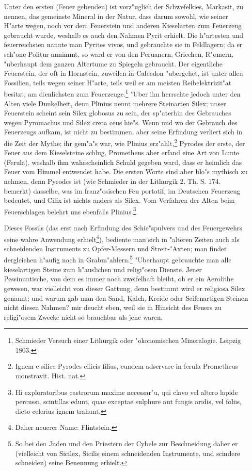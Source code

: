 \documentclass[a4paper, 11pt, oneside, polutonikogreek, german]{article}
\begin{document}
Unter den ersten (Feuer gebenden) ist vorz"uglich der Schwefelkies, Markasit, zu nennen, das gemeinste Mineral in der Natur, dass darum sowohl, wie seiner H"arte wegen, noch vor dem Feuerstein und anderen Kieselarten zum Feuerzeug gebraucht wurde, weshalb es auch den Nahmen Pyrit erhielt. Die h"artesten und feuerreichsten nannte man Pyrites vivos, und gebrauchte sie in Feldlagern; da er sch"one Politur annimmt, so ward er von den Peruanern, Griechen, R"omern, "uberhaupt dem ganzen Altertume zu Spiegeln gebraucht. Der eigentliche Feuerstein, der oft in Hornstein, zuweilen in Calcedon "ubergehet, ist unter allen Fossilien, teils wegen seiner H"arte, teils weil er am meisten Reibelektrizit"at besitzt, am dienlichsten zum Feuerzeuge.\footnote{Schmieder Versuch einer Lithurgik oder "okonomischen Mineralogie. Leipzig 1803.} "Uber ihn herrschte jedoch unter den Alten viele Dunkelheit, denn Plinius nennt mehrere Steinarten Silex; unser Feuerstein scheint sein Silex globosus zu sein, der sp"aterhin des Gebrauches wegen Pyromachus und Silex creta ceus hie"s. Wenn und wo der Gebrauch des Feuerzeugs aufkam, ist nicht zu bestimmen, aber seine Erfindung verliert sich in die Zeit der Mythe; ihr gem"a"s war, wie Plinius erz"ahlt,\footnote{Ignem e silice Pyrodes cilicis filius, eundem adservare in ferula Prometheus monstravit. Hist. nat.} Pyrodes der erste, der Feuer aus dem Kieselsteine schlug, Prometheus aber erfand eine Art von Lunte (Ferula), weshalb ihm wahrscheinlich Schuld gegeben ward, dass er heimlich das Feuer vom Himmel entwendet habe. Die ersten Worte sind aber blo"s mythisch zu nehmen, denn Pyrodes ist (wie Schmieder in der Lithurgik 2. Th. S. 174. bemerkt) dasselbe, was im franz"osischen Feu portatif, im Deutschen Feuerzeug bedeutet, und Cilix ist nichts anders als Silex. Vom Verfahren der Alten beim Feuerschlagen belehrt uns ebenfalls Plinius.\footnote{Hi exploratoribus castrorum maxime necessar"u, qui clavo vel altero lapide percussi, scintillas edunt, quae exceptae sulphure aut fungis aridis, vel foliis, dicto celerius ignem trahunt.}

Dieses Fossils (das erst nach Erfindung des Schie"spulvers und des Feuergewehrs seine wahre Anwendung erhielt\footnote{Daher neuerer Name: Flintstein.}), bediente man sich in "alteren Zeiten auch als schneidenden Instruments zu Opfer-Messern und Streit-"Axten; man findet dergleichen h"aufig noch in Grabm"ahlern.\footnote{So bei den Juden und den Priestern der Cybele zur Beschneidung daher er (vielleicht von Sicilex, Sicilis einem schneidenden Instrumente, und scindere schneiden) seine Benennung erhielt.} "Uberhaupt gebrauchte man alle kieselartigen Steine zum h"auslichen und religi"osen Dienste. Jener Pessinuntische, von dem es immer noch zweifelhaft bleibt, ob er ein Aerolithe gewesen, war vielleicht von dieser Gattung, denn bestimmt wird er religiosa Silex genannt; und warum gab man den Sand, Kalch, Kreide oder Seifenartigen Steinen nicht diesen Nahmen? mir deucht eben, weil sie in Hinsicht des Feuers zu religi"osem Zwecke nicht so brauchbar als jene waren.
\end{document}
